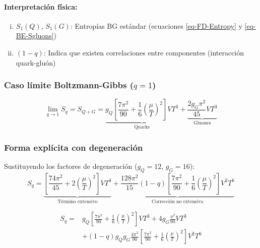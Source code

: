 \paragraph{Interpretación física:}

\begin{enumerate}[i.]
    \item ${S}_1(Q)$, ${S}_1(G)$: Entropías BG estándar (ecuaciones \eqref{eq-FD-Entropy} y \eqref{eq-BE-Sgluons})
    \item $(1-q)$: Indica que existen correlaciones entre componentes (interacción quark-gluón)
\end{enumerate}

\subsubsection*{Caso límite Boltzmann-Gibbs ($q=1$)}
\begin{equation}\label{eq-BG-limit}
\lim_{q\to 1} {S}_q = {S}_{Q+G} = \underbrace{{g}_Q \left[\frac{7\pi^2}{90} + \frac{1}{6}\left(\frac{\mu}{T}\right)^2\right]V T^3}_{\text{Quarks}} + \underbrace{\frac{2g_G\pi^2}{45}V T^3}_{\text{Gluones}}
\end{equation}

\subsubsection*{Forma explícita con degeneración}
Sustituyendo los factores de degeneración ($g_Q=12$, $g_G=16$):
\begin{equation}\label{eq-Tsallis-Entropy-final}
{S}_q = \underbrace{\left[\frac{74\pi^2}{45} + 2\left(\frac{\mu}{T}\right)^2\right]V T^3}_{\text{Término extensivo}} + \underbrace{\frac{128\pi^2}{15}(1-q)\left[\frac{7\pi^2}{90} + \frac{1}{6}\left(\frac{\mu}{T}\right)^2\right]V^2 T^6}_{\text{Corrección no extensiva}}
\end{equation}

\begin{equation}
\begin{split}
{S}_{q} = & {g}_{Q} \left[\frac{7{\pi}^{2}}{90} + \frac{1}{6} \left(\frac{\mu}{T} \right)^{2} \right] V{T}^{3} + 4{g}_{G} \frac{{\pi}^{2}}{90} V {T}^{3} \\
& + \left(1-q \right) {g}_{Q}{g}_{G} \frac{4{\pi}^{2}}{90} \left[\frac{7{\pi}^{2}}{90} + \frac{1}{6} \left(\frac{\mu}{T} \right)^{2}\right]{V}^{2}{T}^{6}
\end{split}
\end{equation}


